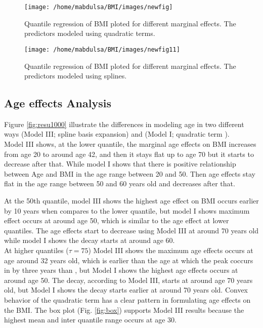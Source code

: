 \documentclass[
  12pt,
]{article}
\begin{document}
\begin{figure}

{\centering \texttt{[image: /home/mabdulsa/BMI/images/newfig]} 

}

\caption{Quantile regression of BMI ploted  for different marginal effects. The predictors modeled using quadratic terms. }\label{fig:resu1}
\end{figure}

\begin{figure}

{\centering \texttt{[image: /home/mabdulsa/BMI/images/newfig11]} 

}

\caption{Quantile regression of BMI ploted  for different marginal effects. The predictors modeled using splines. }\label{fig:resu12}
\end{figure}

\subsection{Age effects Analysis}

Figure \ref{fig:resu1000} illustrate the differences in modeling age in two different ways (Model III; spline basis expansion) and (Model I; quadratic term ).\\
Model III shows, at the lower quantile, the marginal age effects on BMI increases from age 20 to around age 42, and then it stays flat up to age 70 but it starts to decrease after that. While model I shows that there is positive relationship between Age and BMI in the age range between 20 and 50. Then age effects stay flat in the age range between 50 and 60 years old and decreases after that.

At the 50th quantile, model III shows the highest age effect on BMI occurs earlier by 10 years when compares to the lower quantile, but model I shows maximum effect occurs at around age 50, which is similar to the age effect at lower quantiles. The age effects start to decrease using Model III at around 70 years old while model I shows the decay starts at around age 60.\\
At higher quantiles (\(\tau=75\)) Model III shows the maximum age effects occurs at age around 32 years old, which is earlier than the age at which the peak coccurs in by three years than , but Model I shows the highest age effects occurs at around age 50. The decay, according to Model III, starts at around age 70 years old, but Model I shows the decay starts earlier at around 70 years old. Convex behavior of the quadratic term has a clear pattern in formulating age effects on the BMI. The box plot (Fig. \ref{fig:box}) supports Model III results because the highest mean and inter quantile range occurs at age 30.
\end{document}
